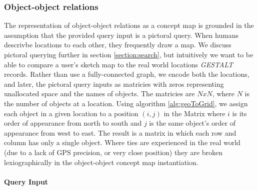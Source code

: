 \subsubsection{Object-object relations}
The representation of object-object relations as a concept map is grounded in the assumption that the provided query input is a pictoral query. 
When humans descrivbe locations to each other, they frequently draw a map. 
We discuss pictoral querying further in section \ref{section:search}, but intuitively we want to be able to compare a user's sketch map to the real world locations \emph{GESTALT} records. 
Rather than use a fully-connected graph, we encode both the locations, and later, the pictoral query inputs as matricies with zeros representing unallocated space and the names of objects. 
The matricies are $NxN$, where $N$ is the number of objects at a location. 
Using algorithm \ref{alg:geoToGrid}, we assign each object in a given location to a position $(i,j)$ in the Matrix where $i$ is its order of appearance from north to south and $j$ is the same object's order of appearance from west to east. 
The result is a matrix in which each row and column has only a single object. Where ties are experienced in the real world (due to a lack of GPS precision, or very close position) they are broken lexiographically in the object-object concept map instantiation.



\paragraph{Query Input}

